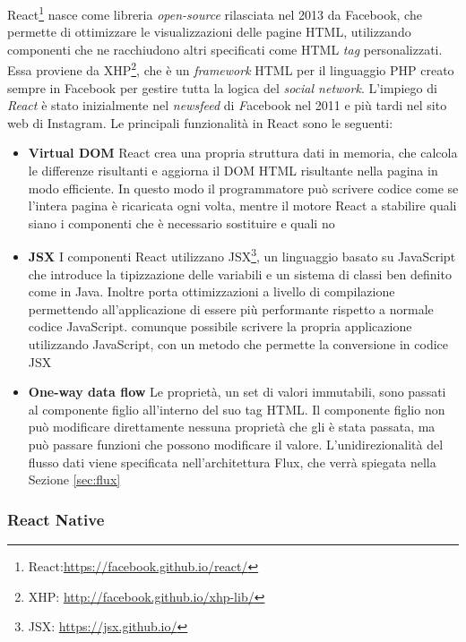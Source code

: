 React\footnote{React:\url{https://facebook.github.io/react/}} nasce come libreria \emph{open-source} rilasciata nel 2013 da Facebook, che permette di ottimizzare le visualizzazioni delle pagine HTML, utilizzando componenti che ne racchiudono altri specificati come HTML \emph{tag} personalizzati.
Essa proviene da XHP\footnote{XHP: \url{http://facebook.github.io/xhp-lib/}}, che è un \emph{framework} HTML per il linguaggio PHP creato sempre in Facebook per gestire tutta la logica del \emph{social network}. L'impiego di \emph{React} è stato inizialmente nel \emph{newsfeed} di \emph Facebook nel 2011 e più tardi nel sito web di Instagram.
Le principali funzionalità in React sono le seguenti:

\begin{itemize}
	\item \textbf{Virtual DOM}
	React crea una propria struttura dati in memoria, che calcola le differenze risultanti e aggiorna il DOM HTML risultante nella pagina in modo efficiente. In questo modo il programmatore può scrivere codice come se l'intera pagina è ricaricata ogni volta, mentre il motore React a stabilire quali siano i componenti che è necessario sostituire e quali no
	\item \textbf{JSX}
	I componenti React utilizzano JSX\footnote{JSX: \url{https://jsx.github.io/}}, un linguaggio basato su JavaScript che introduce la tipizzazione delle variabili e un sistema di classi ben definito come in Java. Inoltre porta ottimizzazioni a livello di compilazione permettendo all'applicazione di essere più performante rispetto a normale codice JavaScript. \upe comunque possibile scrivere la propria applicazione utilizzando JavaScript, con un metodo che permette la conversione in codice JSX
	\item \textbf{One-way data flow}
	Le proprietà, un set di valori immutabili, sono passati al componente figlio all'interno del suo tag HTML. Il componente figlio non può modificare direttamente nessuna proprietà che gli è stata passata, ma può passare funzioni che possono modificare il valore. 
	L'unidirezionalità del flusso dati viene specificata nell'architettura Flux, che verrà spiegata nella Sezione \ref{sec:flux}
\end{itemize}

\subsubsection{React Native}\label{sec:react-native}


